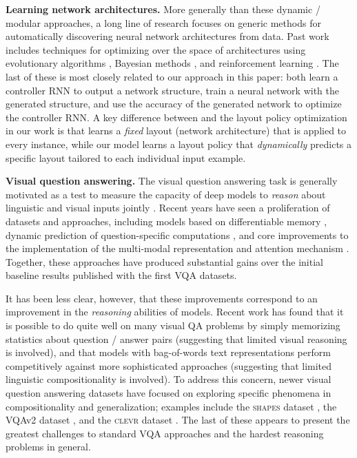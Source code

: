 \documentclass[10pt,twocolumn,letterpaper]{article}
\newcommand{\shapes}{\textsc{shapes}\xspace}
\newcommand{\clevr}{\textsc{clevr}\xspace}
\newcommand{\myparagraph}[1]{\noindent\textbf{#1}}
\begin{document}
\myparagraph{Learning network architectures.} More generally than these dynamic / modular approaches, a long line of research focuses on generic methods for automatically discovering neural network architectures from data. Past work includes techniques for optimizing over the space of architectures using evolutionary algorithms \cite{wierstra2005modeling,floreano2008neuroevolution}, Bayesian methods \cite{bergstra2013making}, and reinforcement learning \cite{zoph2017neural}. The last of these is most closely related to our approach in this paper: both learn a controller RNN to output a network structure, train a neural network with the generated structure, and use the accuracy of the generated network to optimize the controller RNN. A key difference between \cite{zoph2017neural} and the layout policy optimization in our work is that \cite{zoph2017neural} learns a \textit{fixed} layout (network architecture) that is applied to every instance, while our model learns a layout policy that \textit{dynamically} predicts a specific layout tailored to each individual input example.

\myparagraph{Visual question answering.} The visual question answering task \cite{malinowski14nips} is generally motivated  as a test to measure the capacity of deep models to \emph{reason} about linguistic and visual inputs jointly \cite{malinowski14nips}. Recent years have seen a proliferation of datasets \cite{malinowski14nips,antol15iccv} and approaches, including models  based on differentiable memory \cite{yang2016stacked,xiong16dynamic}, dynamic prediction of question-specific computations \cite{Noh15DPPVQA,andreas2016learning}, and core improvements to the implementation of the multi-modal representation and attention mechanism \cite{fukui16emnlp,lu2016hiecoatt}. Together, these approaches have produced substantial gains over the initial baseline results published with
the first VQA datasets.

It has been less clear, however, that these improvements correspond to an improvement in the \emph{reasoning} abilities of models. Recent work has found that it is possible to do quite well on many visual QA problems by simply memorizing statistics about question / answer pairs \cite{goyal2016vqa2} (suggesting that limited visual reasoning is involved), and that models with bag-of-words text representations perform competitively against more sophisticated approaches \cite{jabri2016revisiting} (suggesting that limited linguistic 
compositionality is involved). To address this concern, newer visual question answering datasets have focused on exploring specific phenomena in compositionality and generalization; examples include the \shapes dataset \cite{andreas16neural}, the VQAv2 dataset \cite{goyal2016vqa2}, and the \clevr dataset \cite{johnson2017clevr}. The last of these appears to present the greatest challenges to standard VQA approaches and the hardest reasoning problems in general.
\end{document}
